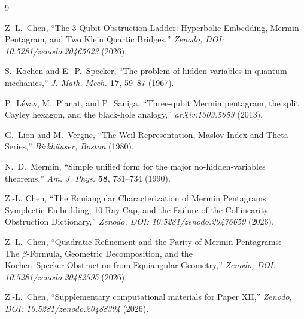 \documentclass[11pt,a4paper]{article}
\theoremstyle{remark}
\begin{document}
\begin{thebibliography}{9}

Z.-L.~Chen,
``The 3-Qubit Obstruction Ladder: Hyperbolic Embedding,
Mermin Pentagram, and Two Klein Quartic Bridges,''
\textit{Zenodo, DOI: 10.5281/zenodo.20465623} (2026).

S.~Kochen and E.~P.~Specker,
``The problem of hidden variables in quantum mechanics,''
\textit{J. Math. Mech.} \textbf{17}, 59--87 (1967).

P.~L\'evay, M.~Planat, and P.~Saniga,
``Three-qubit Mermin pentagram, the split Cayley hexagon, and
the black-hole analogy,''
\textit{arXiv:1303.5653} (2013).

G.~Lion and M.~Vergne,
``The Weil Representation, Maslov Index and Theta Series,''
\textit{Birkh\"auser, Boston} (1980).

N.~D.~Mermin,
``Simple unified form for the major no-hidden-variables theorems,''
\textit{Am. J. Phys.} \textbf{58}, 731--734 (1990).

Z.-L. Chen,
``The Equiangular Characterization of Mermin Pentagrams:
Symplectic Embedding, 10-Ray Cap, and the Failure of the
Collinearity--Obstruction Dictionary,''
\textit{Zenodo, DOI: 10.5281/zenodo.20476659} (2026).

Z.-L.~Chen,
``Quadratic Refinement and the Parity of Mermin Pentagrams:\\
The $\beta$-Formula, Geometric Decomposition, and the\\
Kochen--Specker Obstruction from Equiangular Geometry,''
\textit{Zenodo, DOI: 10.5281/zenodo.20482595} (2026).

Z.-L.~Chen,
``Supplementary computational materials for Paper XII,''
\textit{Zenodo, DOI: 10.5281/zenodo.20488394} (2026).

\end{thebibliography}
\end{document}
